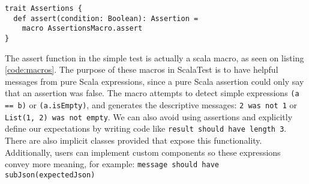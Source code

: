\begin{lstlisting}[caption=Macros, label=code:macros, float]
trait Assertions {
  def assert(condition: Boolean): Assertion =
    macro AssertionsMacro.assert
}
\end{lstlisting}

The assert function in the simple test is actually a scala macro, as seen on listing \ref{code:macros}.
The purpose of these macros in ScalaTest is to have helpful messages from pure Scala expressions, since a pure Scala assertion could only say that an assertion was false.
The macro attempts to detect simple expressions \texttt{(a == b)} or \texttt{(a.isEmpty)}, and generates the descriptive messages: \texttt{2 was not 1} or \texttt{List(1, 2) was not empty}.
We can also avoid using assertions and explicitly define our expectations by writing code like \texttt{result should have length 3}.
There are also implicit classes provided that expose this functionality.
Additionally, users can implement custom components so these expressions convey more meaning, for example: \texttt{message should have subJson(expectedJson)}
